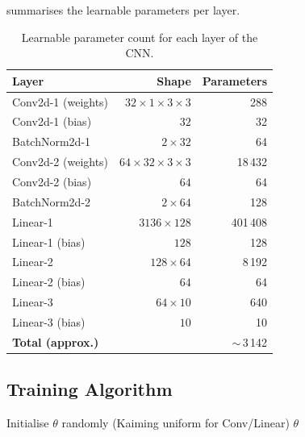 \documentclass[12pt,a4paper]{article}
\begin{document}
 summarises the learnable parameters per layer.

\begin{table}[ht]
\centering
\caption{Learnable parameter count for each layer of the CNN.}
\label{tab:param_count}
\begin{tabular}{lrr}
\toprule
\textbf{Layer} & \textbf{Shape} & \textbf{Parameters} \\
\midrule
Conv2d-1 (weights) & $32\times1\times3\times3$ & 288 \\
Conv2d-1 (bias)    & $32$                       & 32  \\
BatchNorm2d-1      & $2\times32$                & 64  \\
Conv2d-2 (weights) & $64\times32\times3\times3$ & 18\,432 \\
Conv2d-2 (bias)    & $64$                       & 64  \\
BatchNorm2d-2      & $2\times64$                & 128 \\
Linear-1           & $3136\times128$            & 401\,408 \\
Linear-1 (bias)    & $128$                      & 128 \\
Linear-2           & $128\times64$              & 8\,192 \\
Linear-2 (bias)    & $64$                       & 64  \\
Linear-3           & $64\times10$               & 640 \\
Linear-3 (bias)    & $10$                       & 10  \\
\midrule
\textbf{Total (approx.)} & & $\sim$\,3\,142 \\
\bottomrule
\end{tabular}
\end{table}

\subsection{Training Algorithm}
\label{subsec:training}

\begin{algorithm}[H]
\caption{Mini-Batch Training of CNN (Fashion-MNIST)}
\label{alg:cnn_train}
\DontPrintSemicolon
\SetAlgoLined
{}

Initialise $\theta$ randomly (Kaiming uniform for Conv/Linear)\;
\Return $\theta$\;
\end{algorithm}
\end{document}
